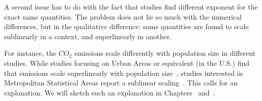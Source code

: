 A second issue has to do with the fact that studies find different exponent for
the exact same quantities. The problem does not lie so much with the numerical
differences, but in the qualitative difference: some quantities are found to
scale sublinearly in a context, and superlinearly in another. 

For instance, the $CO_2$ emissions scale differently with population size in
different studies. While studies focusing on Urban Areas or equivalent (in the
U.S.) find that emissions scale superlinearly with population
size~\cite{Louf:2014_scaling, Oliveira:2014}, studies interested in Metropolitan
Statistical Areas report a sublinear scaling~\cite{Fragkias:2013}. This calls
for an explanation. We will sketch such an explanation in
Chapters~\cite{chap:scaling_model} and~\cite{chap:scaling_implications}.
